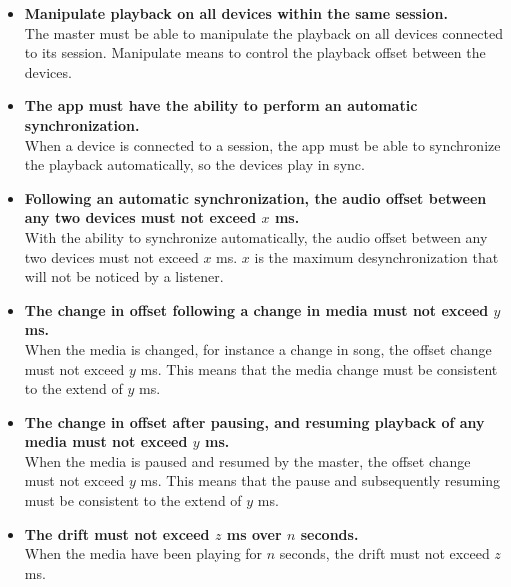 \begin{eletterate}
\begin{itemize}
        \item \textbf{Manipulate playback on all devices within the same session.} \hfill\\
            The master must be able to manipulate the playback on all devices connected to its session.
            Manipulate means to control the playback offset between the devices.
    
        \item \textbf{The app must have the ability to perform an automatic synchronization.} \hfill\\
            When a device is connected to a session, the app must be able to synchronize the playback automatically,
            so the devices play in sync.
    
        \item \textbf{Following an automatic synchronization, the audio offset between any two devices must not exceed $x$ ms.} \hfill\\
            With the ability to synchronize automatically, the audio offset between any two devices must not exceed $x$ ms.
            $x$ is the maximum desynchronization that will not be noticed by a listener.
    
        \item \textbf{The change in offset following a change in media must not exceed $y$ ms.} \hfill\\
            When the media is changed, for instance a change in song, the offset change must not exceed $y$ ms.
            This means that the media change must be consistent to the extend of $y$ ms.

        \item \textbf{The change in offset after pausing, and resuming playback of any media must not exceed $y$ ms.} \hfill\\
            When the media is paused and resumed by the master, the offset change must not exceed $y$ ms.
            This means that the pause and subsequently resuming must be consistent to the extend of $y$ ms.

        \item \textbf{The drift must not exceed $z$ ms over $n$ seconds.} \hfill\\
            When the media have been playing for $n$ seconds, the drift must not exceed $z$ ms.

    \end{itemize}
\end{eletterate}
